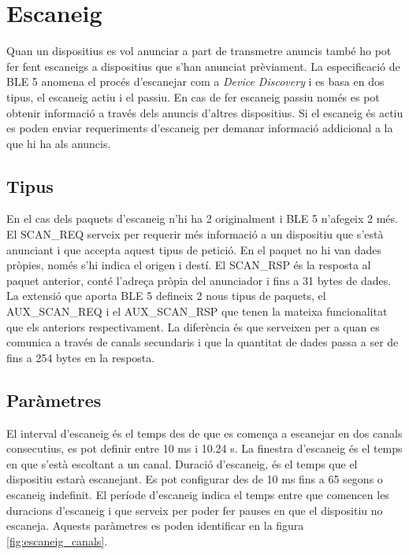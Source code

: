\section{Escaneig}
Quan un dispositius es vol anunciar a part de transmetre anuncis també ho pot fer fent escaneigs a dispositius que s'han anunciat prèviament.
La especificació de BLE 5 anomena el procés d'escanejar com a \textit{Device Discovery} i es basa en dos tipus, el escaneig actiu i el passiu.
En cas de fer escaneig passiu només es pot obtenir informació a través dels anuncis d'altres dispositius.
Si el escaneig és actiu es poden enviar requeriments d'escaneig per demanar informació addicional a la que hi ha als anuncis.

\subsection{Tipus}
En el cas dels paquets d'escaneig n'hi ha 2 originalment i BLE 5 n'afegeix 2 més.
El SCAN\_REQ serveix per requerir més informació a un dispositiu que s'està anunciant i que accepta aquest tipus de petició.
En el paquet no hi van dades pròpies, només s'hi indica el origen i destí.
El SCAN\_RSP és la resposta al paquet anterior, conté l'adreça pròpia del anunciador i fins a 31 bytes de dades.
La extensió que aporta BLE 5 defineix 2 nous tipus de paquets, el AUX\_SCAN\_REQ i el AUX\_SCAN\_RSP que tenen la mateixa funcionalitat que els anteriors respectivament.
La diferència és que serveixen per a quan es comunica a través de canals secundaris i que la quantitat de dades passa a ser de fins a 254 bytes en la resposta.

\subsection{Paràmetres}
El interval d'escaneig és el temps des de que es comença a escanejar en dos canals consecutius, es pot definir entre 10 ms i 10.24 s.
La finestra d'escaneig és el temps en que s'està escoltant a un canal.
Duració d'escaneig, és el temps que el dispositiu estarà escanejant.
Es pot configurar des de 10 ms fins a 65 segons o escaneig indefinit.
El període d'escaneig indica el temps entre que comencen les duracions d'escaneig i que serveix per poder fer pauses en que el dispositiu no escaneja.
Aquests paràmetres es poden identificar en la figura \ref{fig:escaneig_canals}.


